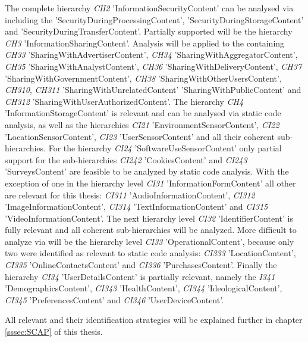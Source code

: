 The complete hierarchy \textit{CH2} 'InformationSecurityContent' can be analysed via \sca including the \ipp 'SecurityDuringProcessingContent', 'SecurityDuringStorageContent' and 'SecurityDuringTransferContent'.
Partially supported will be the hierarchy \textit{CH3} 'InformationSharingContent'. Analysis will be applied to the containing \ipp \textit{CH33} 'SharingWithAdvertiserContent', \textit{CH34} 'SharingWithAggregatorContent', \textit{CH35} 'SharingWithAnalystContent', \textit{CH36} 'SharingWithDeliveryContent', \textit{CH37} 'SharingWithGovernmentContent', \textit{CH38} 'SharingWithOtherUsersContent', \textit{CH310}, \textit{CH311} 'SharingWithUnrelatedContent' 'SharingWithPublicContent' and \textit{CH312} 'SharingWithUserAuthorizedContent'.
The hierarchy \textit{CH4} 'InformationStorageContent' is relevant and can be analysed via static code analysis, as well as the hierarchies \textit{CI21} 'EnvironmentSensorContent', \textit{CI22} 'LocationSensorContent', \textit{CI23} 'UserSensorContent' and all their coherent sub-hierarchies.
For the hierarchy \textit{CI24} 'SoftwareUseSensorContent' only partial support for the sub-hierarchies \textit{CI242} 'CookiesContent' and \textit{CI243} 'SurveysContent' are feasible to be analyzed by static code analysis.
With the exception of one \ipp in the hierarchy level \textit{CI31} 'InformationFormContent' all other \ipp are relevant for this thesis: \textit{CI311} 'AudioInformationContent', \textit{CI312} 'ImageInformationContent', \textit{CI314} 'TextInformationContent' and \textit{CI315} 'VideoInformationContent'.
The next hierarchy level \textit{CI32} 'IdentifierContent' is fully relevant and all coherent sub-hierarchies will be analyzed.
More difficult to analyze via \sca will be the hierarchy level \textit{CI33} 'OperationalContent', because only two \ipp were identified as relevant to static code analysis: \textit{CI333} 'LocationContent', \textit{CI335} 'OnlineContactsContent' and \textit{CI336} 'PurchasesContent'.
Finally the hierarchy \textit{CI34} 'UserDetailsContent' is partially relevant, namely the \ipp \textit{I341} 'DemographicsContent', \textit{CI343} 'HealthContent', \textit{CI344} 'IdeologicalContent', \textit{CI345} 'PreferencesContent' and \textit{CI346} 'UserDeviceContent'.

All relevant \ipp and their \sca identification strategies will be explained further in chapter \ref{sssec:SCAP} of this thesis.
